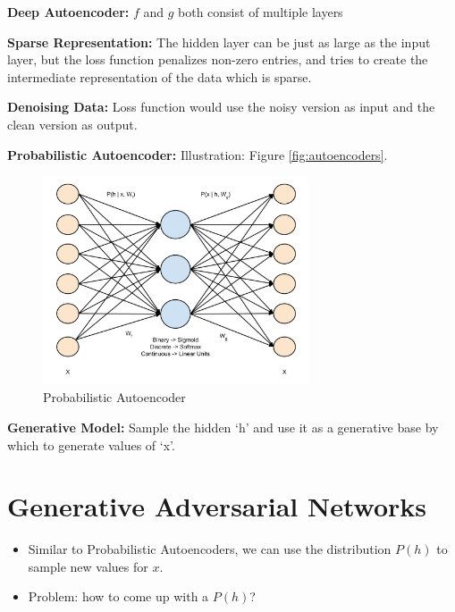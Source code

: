 \documentclass[parskip=half]{scrartcl}
\begin{document}
    \textbf{Deep Autoencoder:}
    $f$ and $g$ both consist of multiple layers

    \textbf{Sparse Representation:}
    The hidden layer can be just as large as the input layer, but the loss function penalizes non-zero entries, and tries to create the intermediate representation of the data which is sparse.

    \textbf{Denoising Data:}
    Loss function would use the noisy version as input and the clean version as output.

    \textbf{Probabilistic Autoencoder:}
    Illustration: Figure \ref{fig:autoencoders}.
    \begin{figure}[ht]
        \centering
        \includegraphics[width=0.7\textwidth]{probabilistic-autoencoder}
        \caption{Probabilistic Autoencoder}
        \label{fig:probabilistic-autoencoder}
    \end{figure}

    \textbf{Generative Model:}
    Sample the hidden `h' and use it as a generative base by which to generate values of `x'.




\section{Generative Adversarial Networks} %
\label{sec:generative_adversarial_networks}

    \begin{itemize}
        \item 
        Similar to Probabilistic Autoencoders, we can use the distribution $P(h)$ to sample new values for $x$.
        \item 
        Problem: how to come up with a $P(h)$?
    \end{itemize}
\end{document}

